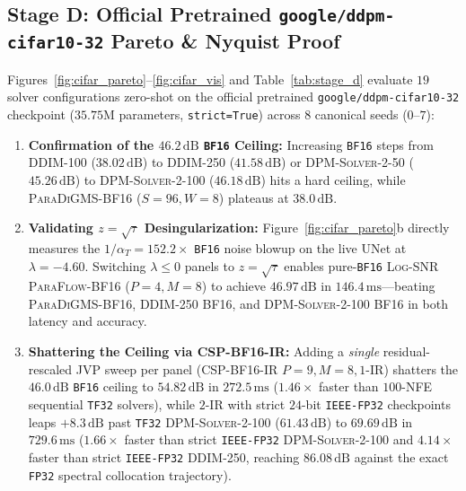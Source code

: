 \documentclass[11pt,a4paper]{article}
\theoremstyle{definition}
\theoremstyle{remark}
\newcommand{\bfsixteen}{\texttt{BF16}}
\newcommand{\fpthirtytwo}{\texttt{FP32}}
\newcommand{\tfthirtytwo}{\texttt{TF32}}
\begin{document}
\subsection{Stage D: Official Pretrained \texttt{google/ddpm-cifar10-32} Pareto \& Nyquist Proof}
Figures~\ref{fig:cifar_pareto}--\ref{fig:cifar_vis} and Table~\ref{tab:stage_d} evaluate $19$ solver configurations zero-shot on the official pretrained \texttt{google/ddpm-cifar10-32} checkpoint ($35.75\text{M}$ parameters, \texttt{strict=True}) across $8$ canonical seeds ($0$--$7$):
\begin{enumerate}[leftmargin=1.8em,itemsep=2pt]
    \item \textbf{Confirmation of the $46.2\,\mathrm{dB}$ \bfsixteen{} Ceiling:} Increasing \bfsixteen{} steps from \textsc{DDIM-100} ($38.02\,\mathrm{dB}$) to \textsc{DDIM-250} ($41.58\,\mathrm{dB}$) or \textsc{DPM-Solver-2-50} ($45.26\,\mathrm{dB}$) to \textsc{DPM-Solver-2-100} ($46.18\,\mathrm{dB}$) hits a hard ceiling, while \textsc{ParaDiGMS-BF16} ($S=96, W=8$) plateaus at $38.0\,\mathrm{dB}$.
    \item \textbf{Validating $z=\sqrt{\tau}$ Desingularization:} Figure~\ref{fig:cifar_pareto}b directly measures the $1/\alpha_T = 152.2\times$ \bfsixteen{} noise blowup on the live UNet at $\lambda = -4.60$. Switching $\lambda \le 0$ panels to $z=\sqrt{\tau}$ enables pure-\bfsixteen{} \textsc{Log-SNR ParaFlow-BF16} ($P=4, M=8$) to achieve \textbf{$46.97\,\mathrm{dB}$} in \textbf{$146.4\,\mathrm{ms}$}---beating \textsc{ParaDiGMS-BF16}, \textsc{DDIM-250 BF16}, and \textsc{DPM-Solver-2-100 BF16} in both latency and accuracy.
    \item \textbf{Shattering the Ceiling via \textsc{CSP-BF16-IR}:} Adding a \emph{single} residual-rescaled JVP sweep per panel (\textsc{CSP-BF16-IR} $P=9, M=8, 1\text{-IR}$) shatters the $46.0\,\mathrm{dB}$ \bfsixteen{} ceiling to \textbf{$54.82\,\mathrm{dB}$} in \textbf{$272.5\,\mathrm{ms}$} ($1.46\times$ faster than $100$-NFE sequential \tfthirtytwo{} solvers), while $2$-IR with strict $24$-bit \texttt{IEEE-FP32} checkpoints leaps $+8.3\,\mathrm{dB}$ past \tfthirtytwo{} \textsc{DPM-Solver-2-100} ($61.43\,\mathrm{dB}$) to \textbf{$69.69\,\mathrm{dB}$} in $729.6\,\mathrm{ms}$ ($1.66\times$ faster than strict \texttt{IEEE-FP32} \textsc{DPM-Solver-2-100} and $4.14\times$ faster than strict \texttt{IEEE-FP32} \textsc{DDIM-250}, reaching \textbf{$86.08\,\mathrm{dB}$} against the exact \fpthirtytwo{} spectral collocation trajectory).
\end{enumerate}
\end{document}
